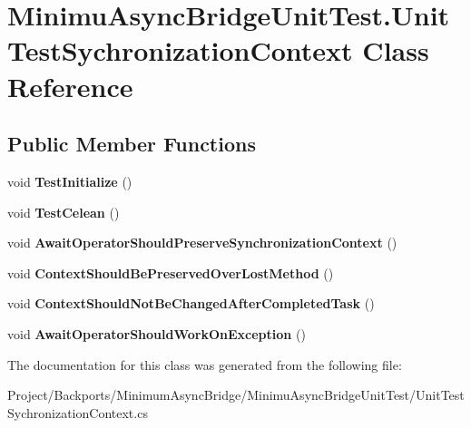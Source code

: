 \hypertarget{class_minimu_async_bridge_unit_test_1_1_unit_test_sychronization_context}{}\section{Minimu\+Async\+Bridge\+Unit\+Test.\+Unit\+Test\+Sychronization\+Context Class Reference}
\label{class_minimu_async_bridge_unit_test_1_1_unit_test_sychronization_context}
\subsection*{Public Member Functions}
\begin{DoxyCompactItemize}
\item 
\mbox{\label{class_minimu_async_bridge_unit_test_1_1_unit_test_sychronization_context_a9ae6d6e3f4c5dc592a0712f18e0e9df4}} 
void {\bfseries Test\+Initialize} ()
\item 
\mbox{\label{class_minimu_async_bridge_unit_test_1_1_unit_test_sychronization_context_abd853d2d2cf86c19612115b31304319e}} 
void {\bfseries Test\+Celean} ()
\item 
\mbox{\label{class_minimu_async_bridge_unit_test_1_1_unit_test_sychronization_context_a948f30fe7ec5091ccc0e230cb60a967c}} 
void {\bfseries Await\+Operator\+Should\+Preserve\+Synchronization\+Context} ()
\item 
\mbox{\label{class_minimu_async_bridge_unit_test_1_1_unit_test_sychronization_context_a233cac2f58566a1202d3a41397e460e8}} 
void {\bfseries Context\+Should\+Be\+Preserved\+Over\+Lost\+Method} ()
\item 
\mbox{\label{class_minimu_async_bridge_unit_test_1_1_unit_test_sychronization_context_abd4229930c456bce16a3a217bf1d2a9c}} 
void {\bfseries Context\+Should\+Not\+Be\+Changed\+After\+Completed\+Task} ()
\item 
\mbox{\label{class_minimu_async_bridge_unit_test_1_1_unit_test_sychronization_context_a93ed04f39c895cad8312dd7956cbdb1c}} 
void {\bfseries Await\+Operator\+Should\+Work\+On\+Exception} ()
\end{DoxyCompactItemize}


The documentation for this class was generated from the following file\+:\begin{DoxyCompactItemize}
\item 
Project/\+Backports/\+Minimum\+Async\+Bridge/\+Minimu\+Async\+Bridge\+Unit\+Test/Unit\+Test\+Sychronization\+Context.\+cs\end{DoxyCompactItemize}
